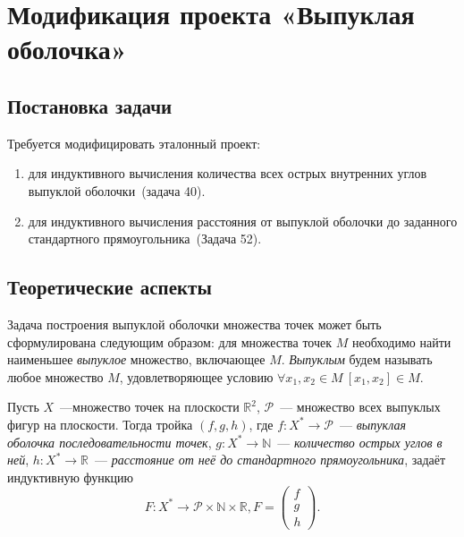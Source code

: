 \section{Модификация проекта «Выпуклая оболочка»}

\subsection{Постановка задачи}
Требуется модифицировать эталонный проект:
\begin{enumerate}
\item для индуктивного вычисления количества всех острых внутренних углов выпуклой оболочки~(задача 40).
\item для индуктивного вычисления расстояния от выпуклой оболочки до заданного стандартного прямоугольника~(Задача 52).
\end{enumerate}
\subsection{Теоретические аспекты}

Задача построения выпуклой оболочки множества точек может быть сформулирована следующим 
образом: для множества точек $M$ необходимо найти наименьшее \emph{выпуклое} множество, 
включающее $M$. \emph{Выпуклым} будем называть любое множество $M$, удовлетворяющее условию
$ \forall x_1, x_2 \in M\ [x_1,x_2]\in M.$

Пусть $X$~---множество точек на плоскости $\mathbb{R}^2$, $\mathcal{P}$~--- множество всех выпуклых фигур на плоскости. Тогда тройка $(f,g,h)$, где 
$f\colon X^* \rightarrow \mathcal{P}$~--- \emph{выпуклая оболочка последовательности точек}, $g\colon X^* \rightarrow \mathbb{N}$~--- \emph{количество острых углов в ней}, $h\colon X^* \rightarrow \mathbb{R}$~--- \emph{расстояние от неё до стандартного прямоугольника}, задаёт индуктивную функцию $$F\colon X^* \rightarrow \mathcal{P} \times \mathbb{N} \times \mathbb{R}, F = \begin{pmatrix}f\\ g\\ h\end{pmatrix}.$$